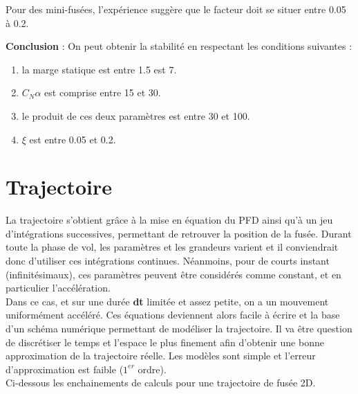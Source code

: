 \documentclass[a4paper]{article}
\begin{document}
Pour des mini-fusées, l'expérience suggère que le facteur doit se situer entre 0.05 à 0.2.

\textbf{Conclusion} : On peut obtenir la stabilité en respectant les conditions suivantes :

\begin{enumerate}
\item la marge statique est entre 1.5 est 7.
\item  \textbf{$C_{N}\alpha$} est comprise entre 15 et 30.
\item le produit de ces deux paramètres est entre 30 et 100.
\item $\xi$ est entre 0.05 et 0.2.
\end{enumerate}


\section{Trajectoire}

La trajectoire s'obtient grâce à la mise en équation du PFD ainsi qu'à un jeu d'intégrations successives, permettant de retrouver la position de la fusée. Durant toute la phase de vol, les paramètres et les grandeurs varient et il conviendrait donc d'utiliser ces intégrations continues.
Néanmoins, pour de courts instant (infinitésimaux), ces paramètres peuvent être considérés comme constant, et en particulier l'accélération.\\

Dans ce cas, et sur une durée \textbf{dt} limitée et assez petite, on a un mouvement uniformément accéléré. Ces équations deviennent alors facile à écrire et la base d'un schéma numérique permettant de modéliser la trajectoire. Il va être question de discrétiser le temps et l'espace le plus finement afin d'obtenir une bonne approximation de la trajectoire réelle. Les modèles sont simple et l'erreur d'approximation est faible ($1^{er}$ ordre).\\

Ci-dessous les enchainements de calculs pour une trajectoire de fusée 2D.
\end{document}
